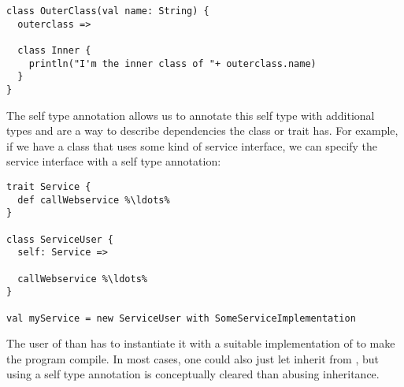 \documentclass[10pt,a4paper,oneside]{scrreprt}
\begin{document}
\begin{lstlisting}
class OuterClass(val name: String) {
  outerclass =>

  class Inner {
    println("I'm the inner class of "+ outerclass.name)
  }
}
\end{lstlisting}

The self type annotation allows us to annotate this self type with additional types and are a way to describe dependencies the class or trait has. For example, if we have a class that uses some kind of service interface, we can specify the service interface with a self type annotation:

\begin{lstlisting}
trait Service {
  def callWebservice %\ldots%
}

class ServiceUser {
  self: Service =>

  callWebservice %\ldots%
}

val myService = new ServiceUser with SomeServiceImplementation
\end{lstlisting}

The user of  than has to instantiate it with a suitable implementation of  to make the program compile. In most cases, one could also just let  inherit from , but using a self type annotation is conceptually cleared than abusing inheritance.



\clearpage
\bib
\end{document}

